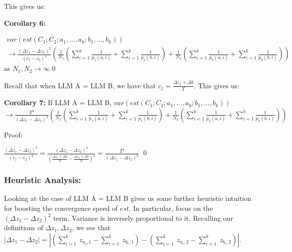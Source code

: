 \documentclass{article}
\begin{document}
This gives us:



\textbf{Corollary 6:}

$\displaystyle  \begin{array}{l}
var\left( est\left( C_{1} ;C_{2} ;a_{1} ,...,a_{k} ;b_{1} ,...,b_{k}\right)\right)\\
\rightarrow \frac{\left( \Delta z_{1} -\Delta z_{2}\right)^{2}}{\left( c_{1} -c_{2}\right)^{4}}\left(\frac{1}{N_{1}}\left(\sum _{i=1}^{k}\frac{1}{p_{1}\left( a,i\right)} +\sum _{i=1}^{k}\frac{1}{p_{1}\left( b,i\right)}\right) +\frac{1}{N_{2}}\left(\sum _{i=1}^{k}\frac{1}{p_{2}\left( a,i\right)} +\sum _{i=1}^{k}\frac{1}{p_{2}\left( b,i\right)}\right)\right)
\end{array}$ as $\displaystyle N_{1} ,N_{2}\rightarrow \infty $\qed 



Recall that when LLM A = LLM B, we have that $\displaystyle c_{j} =\frac{\Delta z_{j} +\Delta b}{T}$. This gives us:



\textbf{Corollary 7:} If LLM A = LLM B, $var\left( est\left( C_{1} ;C_{2} ;a_{1} ,...,a_{k} ;b_{1} ,...,b_{k}\right)\right)$\\
$\rightarrow \frac{T^{4}}{\left( \Delta z_{1} -\Delta z_{2}\right)^{2}}\left(\frac{1}{N_{1}}\left(\sum _{i=1}^{k}\frac{1}{p_{1}\left( a,i\right)} +\sum _{i=1}^{k}\frac{1}{p_{1}\left( b,i\right)}\right) +\frac{1}{N_{2}}\left(\sum _{i=1}^{k}\frac{1}{p_{2}\left( a,i\right)} +\sum _{i=1}^{k}\frac{1}{p_{2}\left( b,i\right)}\right)\right)$



Proof:

$\displaystyle \frac{\left( \Delta z_{1} -\Delta z_{2}\right)^{2}}{\left( c_{1} -c_{2}\right)^{4}} =\frac{\left( \Delta z_{1} -\Delta z_{2}\right)^{2}}{\left(\frac{\Delta z_{1} +\Delta b}{T} -\frac{\Delta z_{2} +\Delta b}{T}\right)^{4}} =\frac{T^{4}}{\left( \Delta z_{1} -\Delta z_{2}\right)^{2}}$ \qed 



\subsubsection*{Heuristic Analysis:}

Looking at the case of LLM A = LLM B gives us some further heuristic intuition for boosting the convergence speed of $\displaystyle est$. In particular, focus on the $\displaystyle \left( \Delta z_{1} -\Delta z_{2}\right)^{2}$ term. Variance is inversely proportional to it. Recalling our definitions of $\displaystyle \Delta z_{1} ,\Delta z_{2}$, we see that $\displaystyle |\Delta z_{1} -\Delta z_{2} |=|\left(\sum _{i=1}^{k} \ z_{a_{i} ,1} -\sum _{i=1}^{k} \ z_{b_{i} ,1}\right) -\left(\sum _{i=1}^{k} \ z_{a_{i} ,2} -\sum _{i=1}^{k} \ z_{b_{i} ,2}\right) |$.
\end{document}
